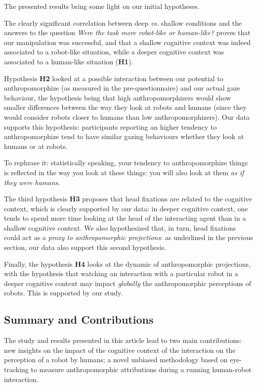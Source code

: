 \documentclass[lettersize, noapacite, twoside, HRI]{apa_HRI}
\newcommand{\vs}{\textit{vs.}\xspace}
\newcommand{\h}[1]{\textbf{H#1}\xspace}
\begin{document}
The presented results bring some light on our initial hypotheses.

The clearly significant correlation between deep \vs shallow conditions and the
answers to the question \emph{Were the task more robot-like or human-like?}
proves that our manipulation was successful, and that a shallow cognitive
context was indeed associated to a robot-like situation, while a deeper
cognitive context was associated to a human-like situation (\h{1}).

Hypothesis \h{2} looked at a possible interaction between our potential to
anthropomorphize (as measured in the pre-questionnaire) and our actual gaze
behaviour, the hypothesis being that high anthropomorphizers would show smaller
differences between the way they look at robots and humans (since they would
consider robots closer to humans than low anthropomorphizers). Our data supports
this hypothesis: participants reporting an higher tendency to anthropomorphize
tend to have similar gazing behaviours whether they look at humans or at robots.

To rephrase it: statistically speaking, your tendency to anthropomorphize things
is reflected in the way you look at these things: you will also look at them
\emph{as if they were humans}.

The third hypothesis \h{3} proposes that head fixations are related to the
cognitive context, which is clearly supported by our data: in deeper cognitive
context, one tends to spend more time looking at the head of the interacting
agent than in a shallow cognitive context. We also hypothesized that, in turn,
head fixations could act as a \emph{proxy to anthropomorphic projections}: as
underlined in the previous section, our data also support this second
hypothesis.

Finally, the hypothesis \h{4} looks at the dynamic of anthropomorphic
projections, with the hypothesis that watching an interaction with a particular
robot in a deeper cognitive context may impact \emph{globally} the
anthropomorphic perceptions of robots. This is supported by our study.

\subsection{Summary and Contributions}

The study and results presented in this article lead to two main contributions:
new insights on the impact of the cognitive context of the interaction on the
perception of a robot by humans; a novel unbiased methodology based on
eye-tracking to measure anthropomorphic attributions during a running
human-robot interaction.
\end{document}
